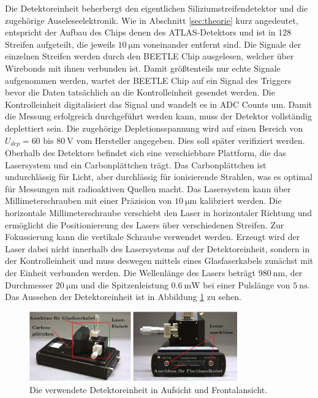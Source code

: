Die Detektoreinheit beherbergt den eigentlichen Siliziumstreifendetektor und die zugehörige Auseleseelektronik.
Wie in Abschnitt \ref{sec:theorie} kurz angedeutet, entspricht der Aufbau des Chips denen des ATLAS-Detektors und ist in 128 Streifen aufgeteilt, die jeweils $\SI{10}{\micro\metre}$ voneinander entfernt sind.
Die Signale der einzelnen Streifen werden durch den BEETLE Chip ausgelesen, welcher über Wirebonds mit ihnen verbunden ist.
Damit größtenteils nur echte Signale aufgenommen werden, wartet der BEETLE Chip auf ein Signal des Triggers bevor die Daten tatsächlich an die Kontrolleinheit gesendet werden.
Die Kontrolleinheit digitalisiert das Signal und wandelt es in ADC Counts um.
Damit die Messung erfolgreich durchgeführt werden kann, muss der Detektor vollständig deplettiert sein.
Die zugehörige Depletionsspannung wird auf einen Bereich von $U_{dep} = 60$ bis $\SI{80}{\volt}$ vom Hersteller angegeben.
Dies soll später verifiziert werden.
Oberhalb des Detektors befindet sich eine verschiebbare Plattform, die das Lasersystem und ein Carbonplättchen trägt.
Das Carbonplättchen ist undurchlässig für Licht, aber durchlässig für ionisierende Strahlen, was es optimal für Messungen mit radioaktiven Quellen macht.
Das Lasersystem kann über Millimeterschrauben mit einer Präzision von $\SI{10}{\micro\metre}$ kalibriert werden.
Die horizontale Millimeterschraube verschiebt den Laser in horizontaler Richtung und ermöglicht die Positioniereung des Lasers über verschiedenen Streifen.
Zur Fokussierung kann die vertikale Schraube verwendet werden.
Erzeugt wird der Laser dabei nicht innerhalb des Lasersystems auf der Detektoreinheit, sondern in der Kontrolleinheit und muss deswegen mittels eines Glasfaserkabels zunächst mit der Einheit verbunden werden.
Die Wellenlänge des Lasers beträgt $\SI{980}{\nano\metre}$, der Durchmesser $\SI{20}{\micro\metre}$ und die Spitzenleistung $\SI{0.6}{\milli\watt}$ bei einer Pulslänge von $\SI{5}{\nano\second}$.
Das Aussehen der Detektoreinheit ist in Abbildung \ref{fig:detektoreinheit} zu sehen.

\begin{figure}[H]
  \centering
  \includegraphics[width=0.8\textwidth]{content/graphics/detektoreinheit.png}
  \caption{Die verwendete Detektoreinheit in Aufsicht und Frontalansicht.}
  \label{fig:detektoreinheit}
\end{figure}

